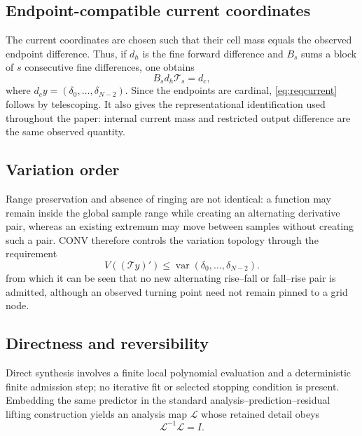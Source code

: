 \documentclass[journal]{IEEEtran}
\newcommand{\Tcal}{\mathcal{T}}
\newcommand{\var}{\operatorname{var}}
\begin{document}
\subsection{Endpoint-compatible current coordinates}

The current coordinates are chosen such that their cell mass equals the
observed endpoint difference. Thus, if \(d_h\) is the fine forward difference
and \(B_s\) sums a block of \(s\) consecutive fine differences, one obtains
\begin{equation}
 B_s d_h\Tcal_s=d_c,
 \label{eq:reqcurrent}
\end{equation}
where \(d_c y=(\delta_0,\ldots,\delta_{N-2})\). Since the endpoints are
cardinal, \eqref{eq:reqcurrent} follows by telescoping. It also gives the
representational identification used throughout the paper: internal current
mass and restricted output difference are the same observed quantity.

\subsection{Variation order}

Range preservation and absence of ringing are not identical: a function may
remain inside the global sample range while creating an alternating
derivative pair, whereas an existing extremum may move between samples
without creating such a pair. CONV therefore controls the variation topology
through the requirement
\begin{equation}
 V((\Tcal y)')\leq
 \var(\delta_0,\ldots,\delta_{N-2}).
 \label{eq:reqvariation}
\end{equation}
from which it can be seen that no new alternating rise--fall or fall--rise
pair is admitted, although an observed turning point need not remain pinned
to a grid node.

\subsection{Directness and reversibility}

Direct synthesis involves a finite local polynomial evaluation and a
deterministic finite admission step; no iterative fit or selected stopping
condition is present. Embedding the same predictor in the standard
analysis--prediction--residual lifting construction yields an analysis map
\(\mathcal L\) whose retained detail obeys
\begin{equation}
 \mathcal L^{-1}\mathcal L=I.
 \label{eq:reqinverse}
\end{equation}
\end{document}
